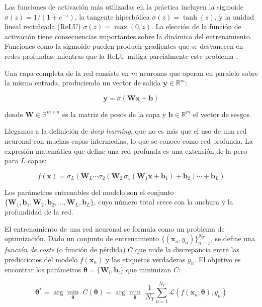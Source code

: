 Las funciones de activación más utilizadas en la práctica incluyen la sigmoide $\sigma(z) = 1/(1+e^{-z})$, la tangente hiperbólica $\sigma(z) = \tanh(z)$, y la unidad lineal rectificada (ReLU) $\sigma(z) = \max(0, z)$. La elección de la función de activación tiene consecuencias importantes sobre la dinámica del entrenamiento. Funciones como la sigmoide pueden producir gradientes que se desvanecen en redes profundas, mientras que la ReLU mitiga parcialmente este problema .

Una capa completa de la red consiste en $m$ neuronas que operan en paralelo sobre la misma entrada, produciendo un vector de salida $\mathbf{y} \in \mathbb{R}^m$:

\begin{equation} \label{eq: capa}
    \mathbf{y} = \sigma(\mathbf{W}\mathbf{x} + \mathbf{b})
\end{equation}

donde $\mathbf{W} \in \mathbb{R}^{m \times n}$ es la matriz de pesos de la capa y $\mathbf{b} \in \mathbb{R}^m$ el vector de sesgos.

Llegamos a la definición de \textit{deep learning}, que no es más que el uso de una red neuronal con muchas capas intermedias, lo que se conoce como red profunda. La expresión matemática que define una red profunda es una extensión de la pero para $L$ capas:

\begin{equation} \label{eq: red_profunda}
    f(\mathbf{x}) = \sigma_L(\mathbf{W}_L \cdots \sigma_2(\mathbf{W}_2 \, \sigma_1(\mathbf{W}_1 \mathbf{x} + \mathbf{b}_1) + \mathbf{b}_2) \cdots + \mathbf{b}_L)
\end{equation}

Los parámetros entrenables del modelo son el conjunto $\{\mathbf{W}_1, \mathbf{b}_1, \mathbf{W}_2, \mathbf{b}_2, \ldots, \mathbf{W}_L, \mathbf{b}_L\}$, cuyo número total crece con la anchura y la profundidad de la red.

El entrenamiento de una red neuronal se formula como un problema de optimización. Dado un conjunto de entrenamiento $\{(\mathbf{x}_n, y_n)\}_{n=1}^{N_T}$, se define una \textit{función de coste} (o función de pérdida) $C$ que mide la discrepancia entre las predicciones del modelo $f(\mathbf{x}_n)$ y las etiquetas verdaderas $y_n$. El objetivo es encontrar los parámetros $\boldsymbol{\theta} = \{\mathbf{W}_l, \mathbf{b}_l\}$ que minimizan $C$:

\begin{equation} \label{eq: optimizacion}
    \boldsymbol{\theta}^* = \arg\min_{\boldsymbol{\theta}} \; C(\boldsymbol{\theta}) = \arg\min_{\boldsymbol{\theta}} \; \frac{1}{N_T} \sum_{n=1}^{N_T} \mathcal{L}(f(\mathbf{x}_n; \boldsymbol{\theta}), y_n)
\end{equation}

